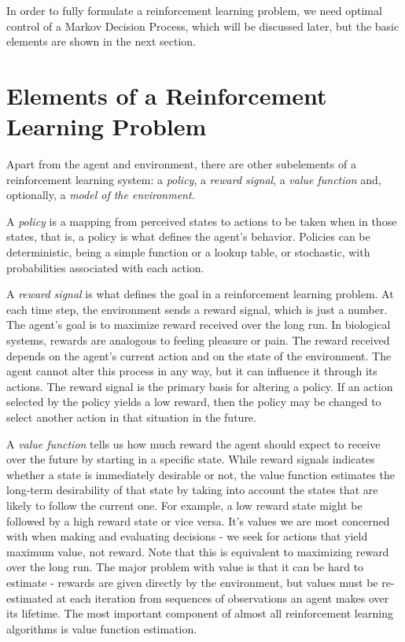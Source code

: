 In order to fully formulate a reinforcement learning problem, we need optimal control of a Markov Decision Process, which will be discussed later, but the basic elements are shown in the next section. 

\section{Elements of a Reinforcement Learning Problem}
Apart from the agent and environment, there are other subelements of a reinforcement learning system: a \textit{policy}, a \textit{reward signal}, a \textit{value function} and, optionally, a \textit{model of the environment}.

A \textit{policy} is a mapping from perceived states to actions to be taken when in those states, that is, a policy is what defines the agent's behavior. Policies can be deterministic, being a simple function or a lookup table, or stochastic, with probabilities associated with each action.

A \textit{reward signal} is what defines the goal in a reinforcement learning problem. At each time step, the environment sends a reward signal, which is just a number. The agent's goal is to maximize reward received over the long run. In biological systems, rewards are analogous to feeling pleasure or pain. The reward received depends on the agent's current action and on the state of the environment. The agent cannot alter this process in any way, but it can influence it through its actions. The reward signal is the primary basis for altering a policy. If an action selected by the policy yields a low reward, then the policy may be changed to select another action in that situation in the future.

A \textit{value function} tells us how much reward the agent should expect to receive over the future by starting in a specific state. While reward signals indicates whether a state is immediately desirable or not, the value function estimates the long-term desirability of that state by taking into account the states that are likely to follow the current one. For example, a low reward state might be followed by a high reward state or vice versa. It's values we are most concerned with when making and evaluating decisions - we seek for actions that yield maximum value, not reward. Note that this is equivalent to maximizing reward over the long run. The major problem with value is that it can be hard to estimate - rewards are given directly by the environment, but values must be re-estimated at each iteration from sequences of observations an agent makes over its lifetime. The most important component of almost all reinforcement learning algorithms is value function estimation.


